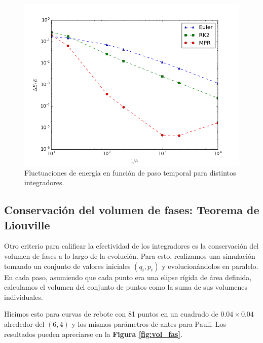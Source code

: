 \documentclass[twoside, 12pt]{article}
\begin{document}
\begin{figure}[h]
	\centering
	\includegraphics[trim = 0mm 0mm 15mm 10mm, clip, width=0.6\columnwidth]{fluct_vs_h.png}
	\caption{Fluctuaciones de energía en función de paso temporal para distintos integradores.}
	\label{fig:flucvsh}
\end{figure}

\subsection{Conservación del volumen de fases: Teorema de Liouville}

Otro criterio para calificar la efectividad de los integradores es la conservación del volumen de fases a lo largo de la evolución.
Para esto, realizamos una simulación tomando un conjunto de valores iniciales $(q_i, p_i)$ y evolucionándolos en paralelo.
En cada paso, asumiendo que cada punto era una elipse rígida de área definida, calculamos el volumen del conjunto de puntos como la suma de sus volumenes individuales.

Hicimos esto para curvas de rebote con 81 puntos en un cuadrado de $0.04\times0.04$ alrededor del $(6, 4)$ y los mismos parámetros de antes para Pauli.
Los resultados pueden apreciarse en la \textbf{Figura \ref{fig:vol_fas}}.
\end{document}
